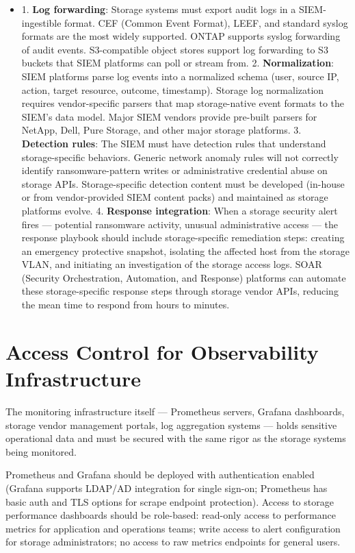 \begin{itemize}
  \item 1. \textbf{Log forwarding}: Storage systems must export audit logs in a SIEM-ingestible format. CEF (Common Event Format), LEEF, and standard syslog formats are the most widely supported. ONTAP supports syslog forwarding of audit events. S3-compatible object stores support log forwarding to S3 buckets that SIEM platforms can poll or stream from.
2. \textbf{Normalization}: SIEM platforms parse log events into a normalized schema (user, source IP, action, target resource, outcome, timestamp). Storage log normalization requires vendor-specific parsers that map storage-native event formats to the SIEM's data model. Major SIEM vendors provide pre-built parsers for NetApp, Dell, Pure Storage, and other major storage platforms.
3. \textbf{Detection rules}: The SIEM must have detection rules that understand storage-specific behaviors. Generic network anomaly rules will not correctly identify ransomware-pattern writes or administrative credential abuse on storage APIs. Storage-specific detection content must be developed (in-house or from vendor-provided SIEM content packs) and maintained as storage platforms evolve.
4. \textbf{Response integration}: When a storage security alert fires --- potential ransomware activity, unusual administrative access --- the response playbook should include storage-specific remediation steps: creating an emergency protective snapshot, isolating the affected host from the storage VLAN, and initiating an investigation of the storage access logs. SOAR (Security Orchestration, Automation, and Response) platforms can automate these storage-specific response steps through storage vendor APIs, reducing the mean time to respond from hours to minutes.
\end{itemize}

\section{Access Control for Observability Infrastructure}
The monitoring infrastructure itself --- Prometheus servers, Grafana dashboards, storage vendor management portals, log aggregation systems --- holds sensitive operational data and must be secured with the same rigor as the storage systems being monitored.

Prometheus and Grafana should be deployed with authentication enabled (Grafana supports LDAP/AD integration for single sign-on; Prometheus has basic auth and TLS options for scrape endpoint protection). Access to storage performance dashboards should be role-based: read-only access to performance metrics for application and operations teams; write access to alert configuration for storage administrators; no access to raw metrics endpoints for general users.

